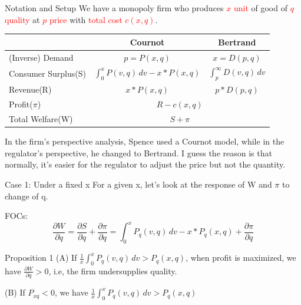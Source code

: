 \documentclass[10pt]{beamer}
\begin{document}
\begin{frame}{Notation and Setup}
We have a monopoly firm who produces \textcolor{red}{$x$ unit} of good of \textcolor{red}{$q$ quality} at \textcolor{red}{$p$ price} with \textcolor{red}{total cost $c(x,q)$}.

\begin{table}[]
\begin{tabular}{l|c|c}
\hline
 & Cournot &  Bertrand  \\
 \hline
(Inverse) Demand & $p = P(x,q)$ & $x = D(p,q)$  \\
Consumer Surplus(S) & $\int_{0}^{x} P(v,q) \,dv - x*P(x,q)$  &  $\int_{p}^{\infty} D(v,q) \,dv$   \\
Revenue(R)& $x*P(x,q)$ & $p*D(p,q)$ \\ 
\hline
Profit($\pi$) & \multicolumn{2}{c}{$R-c(x,q)$} \\
Total Welfare(W) & \multicolumn{2}{c}{$S + \pi$} \\
\hline
\end{tabular}
\end{table}
In the firm's perspective analysis, Spence used a Cournot model, while in the regulator's perspective, he changed to Bertrand. I guess the reason is that normally, it's easier for the regulator to adjust the price but not the quantity.
\end{frame}

\begin{frame}{Case 1: Under a fixed x}
For a given x, let's look at the response of W and $\pi$ to change of q.

FOCs:
\begin{equation}
\frac{\partial W}{\partial q}  = \frac{\partial S}{\partial q} + \frac{\partial \pi}{\partial q} = \int_{0}^{x} P_q(v,q)\,dv - x*P_q(x,q) + \frac{\partial \pi}{\partial q}
\end{equation}

\begin{block}{Proposition 1}
(A) If $\frac{1}{x}\int_{0}^{x} P_q(v,q)\,dv >P_q(x,q)$, when profit is maximized, we have $\frac{\partial W}{\partial q} > 0 $, i.e, the firm undersupplies quality.

(B) If $P_{xq}<0$, we have $\frac{1}{x}\int_{0}^{x} P_q(v,q)\,dv >P_q(x,q)$
\end{block}
\end{frame}
\end{document}
